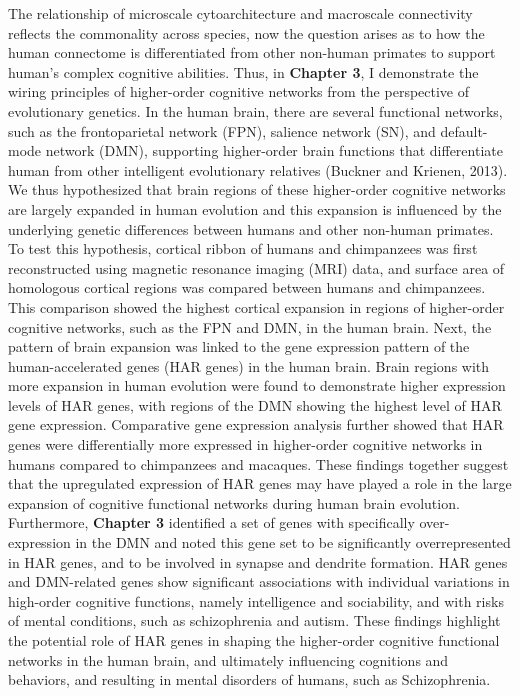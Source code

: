 \begin{refsection}
The relationship of microscale cytoarchitecture and macroscale connectivity reflects the commonality across species, now the question arises as to how the human connectome is differentiated from other non-human primates to support human’s complex cognitive abilities. Thus, in \textbf{Chapter 3}, I demonstrate the wiring principles of higher-order cognitive networks from the perspective of evolutionary genetics. In the human brain, there are several functional networks, such as the frontoparietal network (FPN), salience network (SN), and default-mode network (DMN), supporting higher-order brain functions that differentiate human from other intelligent evolutionary relatives (Buckner and Krienen, 2013). We thus hypothesized that brain regions of these higher-order cognitive networks are largely expanded in human evolution and this expansion is influenced by the underlying genetic differences between humans and other non-human primates. To test this hypothesis, cortical ribbon of humans and chimpanzees was first reconstructed using magnetic resonance imaging (MRI) data, and surface area of homologous cortical regions was compared between humans and chimpanzees. This comparison showed the highest cortical expansion in regions of higher-order cognitive networks, such as the FPN and DMN, in the human brain. Next, the pattern of brain expansion was linked to the gene expression pattern of the human-accelerated genes (HAR genes) in the human brain. Brain regions with more expansion in human evolution were found to demonstrate higher expression levels of HAR genes, with regions of the DMN showing the highest level of HAR gene expression. Comparative gene expression analysis further showed that HAR genes were differentially more expressed in higher-order cognitive networks in humans compared to chimpanzees and macaques. These findings together suggest that the upregulated expression of HAR genes may have played a role in the large expansion of cognitive functional networks during human brain evolution. Furthermore, \textbf{Chapter 3} identified a set of genes with specifically over-expression in the DMN and noted this gene set to be significantly overrepresented in HAR genes, and to be involved in synapse and dendrite formation. HAR genes and DMN-related genes show significant associations with individual variations in high-order cognitive functions, namely intelligence and sociability, and with risks of mental conditions, such as schizophrenia and autism. These findings highlight the potential role of HAR genes in shaping the higher-order cognitive functional networks in the human brain, and ultimately influencing cognitions and behaviors, and resulting in mental disorders of humans, such as Schizophrenia.


\end{refsection}
